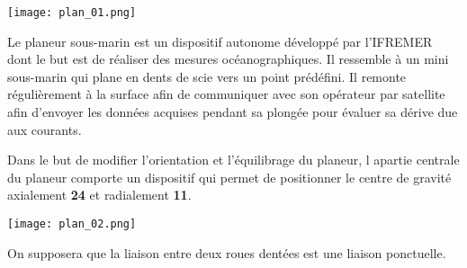 
\begin{marginfigure}
\texttt{[image: plan\_01.png]}
\end{marginfigure}

Le planeur sous-marin est un dispositif autonome développé par l'IFREMER dont le but est de réaliser des mesures océanographiques. Il ressemble à un mini sous-marin qui plane en dents de scie vers un point prédéfini. Il remonte régulièrement à la surface afin de communiquer avec son opérateur par satellite afin d'envoyer les données acquises pendant sa plongée pour évaluer sa dérive due aux courants. 


Dans le but de modifier l'orientation et l'équilibrage du planeur, l apartie centrale du planeur comporte un dispositif qui permet de positionner le centre de gravité axialement \textbf{24} et radialement \textbf{11}. 


\begin{center}
\texttt{[image: plan\_02.png]}
\end{center}


\ifprof
\begin{corrige}
\end{corrige}\else\fi

On supposera que la liaison entre deux roues dentées est une liaison ponctuelle. 


\ifprof
\begin{corrige}
\end{corrige}\else\fi


